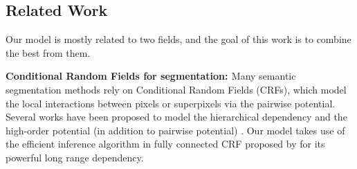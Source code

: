 \subsection{Related Work}
Our model is mostly related to two fields, and the goal of this work is to combine the best from them.

{\bf{Conditional Random Fields for segmentation: }} Many semantic segmentation methods rely on Conditional Random Fields (CRFs), which model the local interactions between pixels \citep{rother2004grabcut, shotton2009textonboost} or superpixels \citep{lucchi2011spatial} via the pairwise potential. Several works have been proposed to model the hierarchical dependency \citep{he2004multiscale, ladicky2009associative, lempitsky2011pylon} and the high-order potential (in addition to pairwise potential) \citep{delong2012fast, gonfaus2010harmony, kohli2009robust, krahenbuhl2011efficient}. Our model takes use of the efficient inference algorithm in fully connected CRF proposed by \citet{krahenbuhl2011efficient} for its powerful long range dependency.

